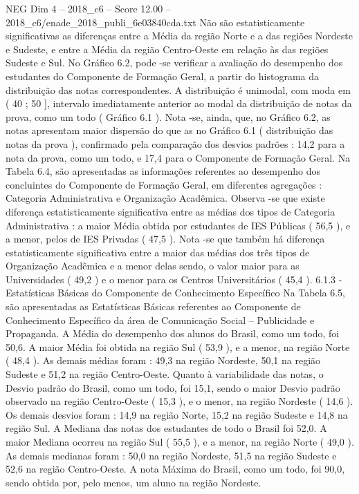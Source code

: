 \begin{textsample}{NEG Dim 4 – 2018\_c6 – Score 12.00 – 2018\_c6/enade\_2018\_publi\_6e03840cda.txt}
Não são estatisticamente significativas as diferenças entre a Média da região Norte e a das regiões Nordeste e Sudeste, e entre a Média da região Centro-Oeste em relação às das regiões Sudeste e Sul.
No Gráfico 6.2, pode -se verificar a avaliação do desempenho dos estudantes do Componente de Formação Geral, a partir do histograma da distribuição das notas correspondentes.
A distribuição é unimodal, com moda em ( 40 ; 50 ], intervalo imediatamente anterior ao modal da distribuição de notas da prova, como um todo ( Gráfico 6.1 ).
Nota -se, ainda, que, no Gráfico 6.2, as notas apresentam maior dispersão do que as no Gráfico 6.1 ( distribuição das notas da prova ), confirmado pela comparação dos desvios padrões : 14,2 para a nota da prova, como um todo, e 17,4 para o Componente de Formação Geral.
Na Tabela 6.4, são apresentadas as informações referentes ao desempenho dos concluintes do Componente de Formação Geral, em diferentes agregações : Categoria Administrativa e Organização Acadêmica.
Observa -se que existe diferença estatisticamente significativa entre as médias dos tipos de Categoria Administrativa : a maior Média obtida por estudantes de IES Públicas ( 56,5 ), e a menor, pelos de IES Privadas ( 47,5 ).
Nota -se que também há diferença estatisticamente significativa entre a maior das médias dos três tipos de Organização Acadêmica e a menor delas sendo, o valor maior para as Universidades ( 49,2 ) e o menor para os Centros Universitários ( 45,4 ). 6.1.3 - Estatísticas Básicas do Componente de Conhecimento Específico Na Tabela 6.5, são apresentadas as Estatísticas Básicas referentes ao Componente de Conhecimento Específico da área de Comunicação Social – Publicidade e Propaganda.
A Média do desempenho dos alunos do Brasil, como um todo, foi 50,6.
A maior Média foi obtida na região Sul ( 53,9 ), e a menor, na região Norte ( 48,4 ).
As demais médias foram : 49,3 na região Nordeste, 50,1 na região Sudeste e 51,2 na região Centro-Oeste.
Quanto à variabilidade das notas, o Desvio padrão do Brasil, como um todo, foi 15,1, sendo o maior Desvio padrão observado na região Centro-Oeste ( 15,3 ), e o menor, na região Nordeste ( 14,6 ).
Os demais desvios foram : 14,9 na região Norte, 15,2 na região Sudeste e 14,8 na região Sul.
A Mediana das notas dos estudantes de todo o Brasil foi 52,0.
A maior Mediana ocorreu na região Sul ( 55,5 ), e a menor, na região Norte ( 49,0 ).
As demais medianas foram : 50,0 na região Nordeste, 51,5 na região Sudeste e 52,6 na região Centro-Oeste.
A nota Máxima do Brasil, como um todo, foi 90,0, sendo obtida por, pelo menos, um aluno na região Nordeste.

\end{textsample}
